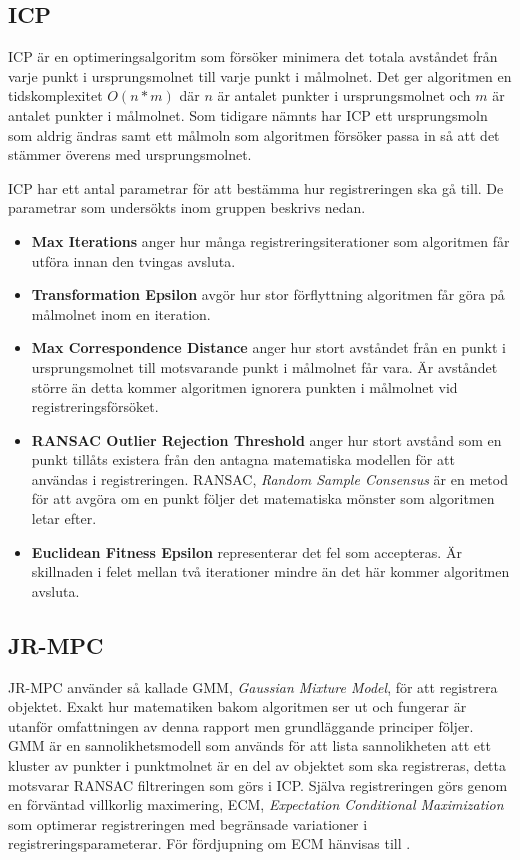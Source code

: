 \subsection{ICP}
ICP är en optimeringsalgoritm som försöker minimera det totala avståndet från varje punkt i ursprungsmolnet till varje punkt i målmolnet. Det ger algoritmen en tidskomplexitet $ \mathit{O(n*m)} $ där $ \mathit{n} $ är antalet punkter i ursprungsmolnet och $ \mathit{m} $ är antalet punkter i målmolnet. Som tidigare nämnts har ICP ett ursprungsmoln som aldrig ändras samt ett målmoln som algoritmen försöker passa in så att det stämmer överens med ursprungsmolnet. 

ICP har ett antal parametrar för att bestämma hur registreringen ska gå till. De parametrar som undersökts inom gruppen beskrivs nedan.
\begin{itemize}
	\item \textbf{Max Iterations} anger hur många registrerings\-iterationer som algoritmen får utföra innan den tvingas avsluta.
	\item \textbf{Transformation Epsilon} avgör hur stor förflyttning algoritmen får göra på målmolnet inom en iteration.
	\item \textbf{Max Correspondence Distance} anger hur stort avståndet från en punkt i ursprungsmolnet till motsvarande punkt i målmolnet får vara. Är avståndet större än detta kommer algoritmen ignorera punkten i målmolnet vid registreringsförsöket.
	\item \textbf{RANSAC Outlier Rejection Threshold} anger hur stort avstånd som en punkt tillåts existera från den antagna matematiska modellen för att användas i registreringen. RANSAC, \textit{Random Sample Consensus} är en metod för att avgöra om en punkt följer det matematiska mönster som algoritmen letar efter.
	\item \textbf{Euclidean Fitness Epsilon} representerar det fel som accepteras. Är skillnaden i felet mellan två iterationer mindre än det här kommer algoritmen avsluta.
\end{itemize}

\subsection{JR-MPC}
JR-MPC använder så kallade GMM, \textit{Gaussian Mixture Model}, för att registrera objektet. Exakt hur matematiken bakom algoritmen ser ut och fungerar är utanför omfattningen av denna rapport men grundläggande principer följer. GMM är en sannolikhetsmodell som används för att lista sannolikheten att ett kluster av punkter i punktmolnet är en del av objektet som ska registreras, detta motsvarar RANSAC filtreringen som görs i ICP. Själva registreringen görs genom en förväntad villkorlig maximering, ECM, \textit{Expectation Conditional Maximization} som optimerar registreringen med begränsade variationer i registreringsparameterar. För fördjupning om ECM hänvisas till \cite{roche2011algorithm}.

